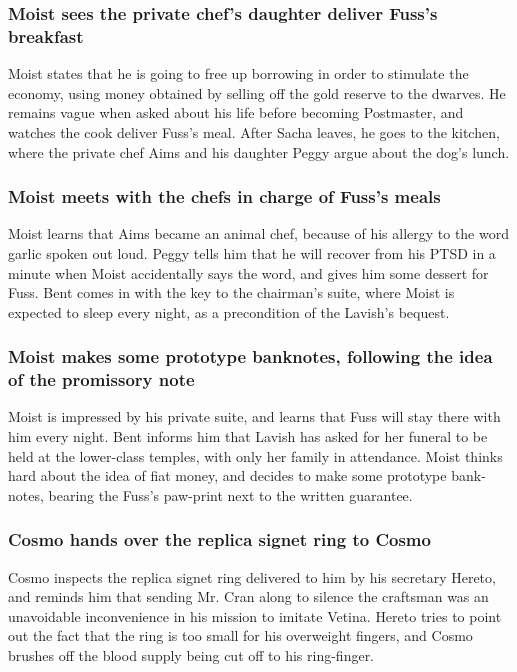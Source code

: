 \subsubsection{\Gls{Moist} sees the private chef's daughter deliver \Gls{Fuss}'s breakfast}
\Gls{Moist} states that he is going to free up borrowing in order to stimulate the economy, using
money obtained by selling off the gold reserve to the dwarves. He remains vague when asked about
his life before becoming Postmaster, and watches the cook deliver \Gls{Fuss}'s meal. After
\Gls{Sacha} leaves, he goes to the kitchen, where the private chef \Gls{Aims} and his daughter
\Gls{Peggy} argue about the dog's lunch.

\subsubsection{\Gls{Moist} meets with the chefs in charge of \Gls{Fuss}'s meals}
\Gls{Moist} learns that \Gls{Aims} became an animal chef, because of his allergy to the word garlic
spoken out loud. \Gls{Peggy} tells him that he will recover from his PTSD in a minute when
\Gls{Moist} accidentally says the word, and gives him some dessert for \Gls{Fuss}. \Gls{Bent} comes
in with the key to the chairman's suite, where \Gls{Moist} is expected to sleep every night, as a
precondition of the \Gls{Lavish}'s bequest.

\subsubsection{\Gls{Moist} makes some prototype banknotes, following the idea of the promissory
    note}
\Gls{Moist} is impressed by his private suite, and learns that \Gls{Fuss} will stay there with him
every night. \Gls{Bent} informs him that \Gls{Lavish} has asked for her funeral to be held at the
lower-class temples, with only her family in attendance. \Gls{Moist} thinks hard about the idea of
fiat money, and decides to make some prototype bank-notes, bearing the \Gls{Fuss}'s paw-print next
to the written guarantee.

\subsubsection{\Gls{Cosmo} hands over the replica signet ring to \Gls{Cosmo}}
\Gls{Cosmo} inspects the replica signet ring delivered to him by his secretary \Gls{Hereto}, and
reminds him that sending Mr. \Gls{Cran} along to silence the craftsman was an unavoidable
inconvenience in his mission to imitate \Gls{Vetina}. \Gls{Hereto} tries to point out the fact
that the ring is too small for his overweight fingers, and \Gls{Cosmo} brushes off the blood supply
being cut off to his ring-finger.

